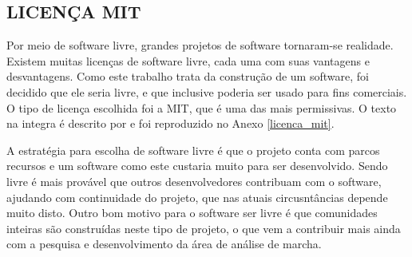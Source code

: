 \subsection{LICENÇA MIT}
\label{mit_sec}

Por meio de software livre, grandes projetos de software tornaram-se realidade. 
Existem muitas licenças de software livre, cada uma com suas vantagens e desvantagens. 
Como este trabalho trata da construção de um software, foi decidido que ele seria livre, e que inclusive poderia ser usado para fins comerciais. 
O tipo de licença escolhida foi a MIT, que é uma das mais permissivas. 
O texto na integra é descrito por  e foi reproduzido no Anexo \ref{licenca_mit}.

A estratégia para escolha de software livre é que o projeto conta com parcos recursos e um software como este custaria muito para ser desenvolvido. 
Sendo livre é mais provável que outros desenvolvedores contribuam com o software, ajudando com continuidade do projeto, que nas atuais circusntâncias depende muito disto.
Outro bom motivo para o software ser livre é que comunidades inteiras são construídas neste tipo de projeto, o que vem a contribuir mais ainda com a pesquisa e desenvolvimento da área de análise de marcha.

